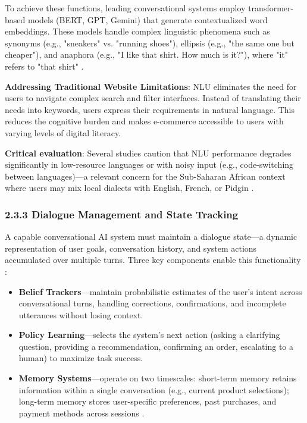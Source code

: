 \documentclass[12pt,a4paper]{article}
\begin{document}
To achieve these functions, leading conversational systems employ transformer-based models (BERT, GPT, Gemini) that generate contextualized word embeddings. These models handle complex linguistic phenomena such as synonyms (e.g., "sneakers" vs. "running shoes"), ellipsis (e.g., "the same one but cheaper"), and anaphora (e.g., "I like that shirt. How much is it?"), where "it" refers to "that shirt" \citep{ranganathan2025, rajasekar2025}.

\textbf{Addressing Traditional Website Limitations}: NLU eliminates the need for users to navigate complex search and filter interfaces. Instead of translating their needs into keywords, users express their requirements in natural language. This reduces the cognitive burden and makes e-commerce accessible to users with varying levels of digital literacy.

\textbf{Critical evaluation}: Several studies caution that NLU performance degrades significantly in low-resource languages or with noisy input (e.g., code-switching between languages)---a relevant concern for the Sub-Saharan African context where users may mix local dialects with English, French, or Pidgin \citep{lopez2025}.

\subsubsection{2.3.3 Dialogue Management and State Tracking}

A capable conversational AI system must maintain a dialogue state---a dynamic representation of user goals, conversation history, and system actions accumulated over multiple turns. Three key components enable this functionality \citep{chintalapudi2025}:

\begin{itemize}
    \item \textbf{Belief Trackers}---maintain probabilistic estimates of the user's intent across conversational turns, handling corrections, confirmations, and incomplete utterances without losing context.
    \item \textbf{Policy Learning}---selects the system's next action (asking a clarifying question, providing a recommendation, confirming an order, escalating to a human) to maximize task success.
    \item \textbf{Memory Systems}---operate on two timescales: short-term memory retains information within a single conversation (e.g., current product selections); long-term memory stores user-specific preferences, past purchases, and payment methods across sessions \citep{liu2026, hamedani2026}.
\end{itemize}
\end{document}
